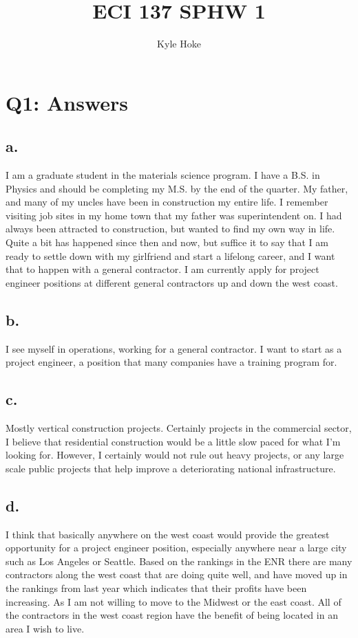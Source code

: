 \documentclass[12pt]{article}
\title{\LARGE ECI 137 SPHW 1}
\author{Kyle Hoke}
\makeatletter
\renewcommand{\maketitle} %
{ \begingroup \vskip 10pt \begin{center} \large {\bf \@title}
	\vskip 10pt \large \@author \hskip 20pt \@date \end{center}
  \vskip 10pt \endgroup \setcounter{footnote}{0} }
\renewcommand{\=}[1]{\stackrel{#1}{=}} %
\theoremstyle{definition}
\theoremstyle{remark}
\makeatother
\begin{document}
\maketitle
\thispagestyle{empty}


\section{Q1: Answers}

\subsection{a.}
I am a graduate student in the materials science program. I have a B.S. in Physics and should be completing my M.S. by the end of the quarter. My father, and many of my uncles have been in construction my entire life. I remember visiting job sites in my home town that my father was superintendent on. I had always been attracted to construction, but wanted to find my own way in life. Quite a bit has happened since then and now, but suffice it to say that I am ready to settle down with my girlfriend and start a lifelong career, and I want that to happen with a general contractor. I am currently apply for project engineer positions at different general contractors up and down the west coast.

\subsection{b.}
I see myself in operations, working for a general contractor. I want to start as a project engineer, a position that many companies have a training program for. 

\subsection{c.}
Mostly vertical construction projects. Certainly projects in the commercial sector, I believe that residential construction would be a little slow paced for what I’m looking for. However, I certainly would not rule out heavy projects, or any large scale public projects that help improve a deteriorating national infrastructure.

\subsection{d.}
I think that basically anywhere on the west coast would provide the greatest opportunity for a project engineer position, especially anywhere near a large city such as Los Angeles or Seattle. Based on the rankings in the ENR there are many contractors along the west coast that are doing quite well, and have moved up in the rankings from last year which indicates that their profits have been increasing. As I am not willing to move to the Midwest or the east coast. All of the contractors in the west coast region have the benefit of being located in an area I wish to live. 
\end{document}
